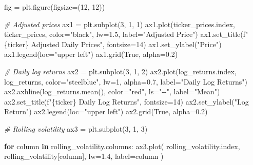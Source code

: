 \documentclass[
  11pt,
]{article}
\newenvironment{Shaded}{}{}
\newcommand{\CommentTok}[1]{\textcolor[rgb]{0.38,0.63,0.69}{\textit{#1}}}
\newcommand{\ControlFlowTok}[1]{\textcolor[rgb]{0.00,0.44,0.13}{\textbf{#1}}}
\newcommand{\DecValTok}[1]{\textcolor[rgb]{0.25,0.63,0.44}{#1}}
\newcommand{\FloatTok}[1]{\textcolor[rgb]{0.25,0.63,0.44}{#1}}
\newcommand{\KeywordTok}[1]{\textcolor[rgb]{0.00,0.44,0.13}{\textbf{#1}}}
\newcommand{\NormalTok}[1]{#1}
\newcommand{\OperatorTok}[1]{\textcolor[rgb]{0.40,0.40,0.40}{#1}}
\newcommand{\SpecialCharTok}[1]{\textcolor[rgb]{0.25,0.44,0.63}{#1}}
\newcommand{\SpecialStringTok}[1]{\textcolor[rgb]{0.73,0.40,0.53}{#1}}
\newcommand{\StringTok}[1]{\textcolor[rgb]{0.25,0.44,0.63}{#1}}
\newcommand{\VariableTok}[1]{\textcolor[rgb]{0.10,0.09,0.49}{#1}}
\begin{document}
\begin{Shaded}
\begin{Highlighting}[]
\NormalTok{fig }\OperatorTok{=}\NormalTok{ plt.figure(figsize}\OperatorTok{=}\NormalTok{(}\DecValTok{12}\NormalTok{, }\DecValTok{12}\NormalTok{))}

\CommentTok{\# Adjusted prices}
\NormalTok{ax1 }\OperatorTok{=}\NormalTok{ plt.subplot(}\DecValTok{3}\NormalTok{, }\DecValTok{1}\NormalTok{, }\DecValTok{1}\NormalTok{)}
\NormalTok{ax1.plot(ticker\_prices.index, ticker\_prices, color}\OperatorTok{=}\StringTok{"black"}\NormalTok{, lw}\OperatorTok{=}\FloatTok{1.5}\NormalTok{, label}\OperatorTok{=}\StringTok{"Adjusted Price"}\NormalTok{)}
\NormalTok{ax1.set\_title(}\SpecialStringTok{f"}\SpecialCharTok{\{}\NormalTok{ticker}\SpecialCharTok{\}}\SpecialStringTok{ Adjusted Daily Prices"}\NormalTok{, fontsize}\OperatorTok{=}\DecValTok{14}\NormalTok{)}
\NormalTok{ax1.set\_ylabel(}\StringTok{"Price"}\NormalTok{)}
\NormalTok{ax1.legend(loc}\OperatorTok{=}\StringTok{"upper left"}\NormalTok{)}
\NormalTok{ax1.grid(}\VariableTok{True}\NormalTok{, alpha}\OperatorTok{=}\FloatTok{0.2}\NormalTok{)}

\CommentTok{\# Daily log returns}
\NormalTok{ax2 }\OperatorTok{=}\NormalTok{ plt.subplot(}\DecValTok{3}\NormalTok{, }\DecValTok{1}\NormalTok{, }\DecValTok{2}\NormalTok{)}
\NormalTok{ax2.plot(log\_returns.index, log\_returns, color}\OperatorTok{=}\StringTok{"steelblue"}\NormalTok{, lw}\OperatorTok{=}\DecValTok{1}\NormalTok{, alpha}\OperatorTok{=}\FloatTok{0.7}\NormalTok{, label}\OperatorTok{=}\StringTok{"Daily Log Returns"}\NormalTok{)}
\NormalTok{ax2.axhline(log\_returns.mean(), color}\OperatorTok{=}\StringTok{"red"}\NormalTok{, ls}\OperatorTok{=}\StringTok{"{-}{-}"}\NormalTok{, label}\OperatorTok{=}\StringTok{"Mean"}\NormalTok{)}
\NormalTok{ax2.set\_title(}\SpecialStringTok{f"}\SpecialCharTok{\{}\NormalTok{ticker}\SpecialCharTok{\}}\SpecialStringTok{ Daily Log Returns"}\NormalTok{, fontsize}\OperatorTok{=}\DecValTok{14}\NormalTok{)}
\NormalTok{ax2.set\_ylabel(}\StringTok{"Log Return"}\NormalTok{)}
\NormalTok{ax2.legend(loc}\OperatorTok{=}\StringTok{"upper left"}\NormalTok{)}
\NormalTok{ax2.grid(}\VariableTok{True}\NormalTok{, alpha}\OperatorTok{=}\FloatTok{0.2}\NormalTok{)}

\CommentTok{\# Rolling volatility}
\NormalTok{ax3 }\OperatorTok{=}\NormalTok{ plt.subplot(}\DecValTok{3}\NormalTok{, }\DecValTok{1}\NormalTok{, }\DecValTok{3}\NormalTok{)}

\ControlFlowTok{for}\NormalTok{ column }\KeywordTok{in}\NormalTok{ rolling\_volatility.columns:}
\NormalTok{    ax3.plot(}
\NormalTok{        rolling\_volatility.index,}
\NormalTok{        rolling\_volatility[column],}
\NormalTok{        lw}\OperatorTok{=}\FloatTok{1.4}\NormalTok{,}
\NormalTok{        label}\OperatorTok{=}\NormalTok{column}
\NormalTok{    )}


\end{Highlighting}
\end{Shaded}
\end{document}
